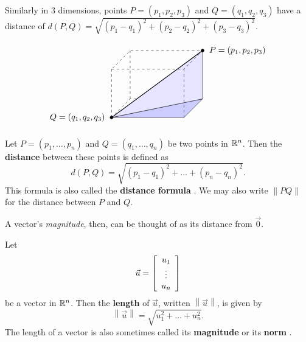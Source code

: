 \documentclass{ximera}
\begin{document}
\begin{example}
\begin{remark}
    Similarly in 3 dimensions, points $P=(p_1,p_2,p_3)$ and
    $Q = (q_1,q_2,q_3)$ have a distance of $d(P,Q)=\sqrt{(p_1-q_1)^2+(p_2-q_2)^2+(p_3-q_3)^2}$.

    \begin{equation*}
      \begin{tikzpicture}[scale=1]
        \draw[dashed] (3,0,-2) -- (0,0,-2) -- (0,0,0);
        \draw[dashed] (0,0,0) -- (0,2,0);
        \draw[dashed] (0,0,-2) -- (0,2,-2);
        \draw[fill=blue!20] (0,0,0) -- (3,0,0) -- (3,0,-2) -- cycle;
        \draw[fill=blue!10] (0,0,0) -- (3,0,-2) -- (3,2,-2) -- cycle;
        \draw[dashed] (0,2,0) -- (3,2,0) -- (3,2,-2) -- (0,2,-2) -- cycle;
        \draw[dashed] (3,0,0) -- (3,2,0);
        \draw[thick] (0,0,0) -- (3,2,-2);
        \draw[fill](0,0,0) circle [radius=1.8pt] node[left=1ex]{$Q=(q_1,q_2,q_3)$};
        \draw[fill](3,2,-2) circle [radius=1.8pt] node[right=1ex]{$P=(p_1,p_2,p_3)$};
      \end{tikzpicture}
    \end{equation*}

  
\begin{definition}
  
      Let $P=(p_1,\ldots,p_n)$ and $Q=(q_1,\ldots,q_n)$ be two points in
      $\R^n$. Then the \textbf{distance}%
       between these points is defined as
      \begin{equation*}
        d(P, Q) = \sqrt{(p_1-q_1)^2 + \ldots + (p_n-q_n)^2}.
      \end{equation*}
      This formula is also called the \textbf{distance formula}%
      . We may also write $\left\|PQ\right\|$ for the
      distance between $P$ and $Q$.
    \end{definition}

A vector's \textit{magnitude}, then, can be thought of as its distance from $\vec{0}$. 

\begin{definition}
  Let
  \begin{equation*}
    \vec{u} = \startmat{c} u_1 \\ \vdots \\ u_n \stopmat
  \end{equation*}
  be a vector in $\R^n$. Then the \textbf{length}%
   of $\vec{u}$, written $\left\| \vec{u} \right\|$,
  is given by
  \begin{equation*}
    \left\| \vec{u} \right\| = \sqrt{u_1^2 + \ldots + u_n^2}.
  \end{equation*}
  The length of a vector is also sometimes called its
  \textbf{magnitude}%
   or its
  \textbf{norm}%
  .
\end{definition}


\end{remark}
\end{example}
\end{document}
